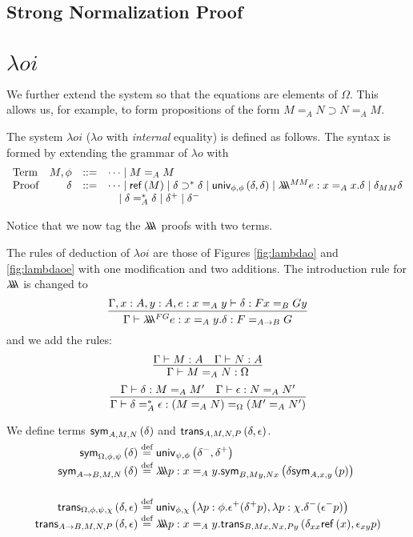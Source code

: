 \subsection{Strong Normalization Proof}







\section{$\lambda o i$}

We further extend the system so that the equations are elements of $\Omega$.  This allows us, for example,
to form propositions of the form $M =_A N \supset N =_A M$.

The system $\lambda o i$ ($\lambda o$ with \emph{internal} equality) is defined as follows.  The
syntax is formed by extending the grammar of $\lambda o$ with
\[
\begin{array}{lrcl}
\text{Term} & M, \phi & ::= & \cdots \mid M =_A M \\
\text{Proof} & \delta & ::= & \cdots \mid \mathsf{ref} \left( {M} \right) \mid \delta \supset^* \delta \mid \mathsf{univ}_{{\phi} , {\phi}} \left( {\delta} , {\delta} \right) \mid \lambda \!\! \lambda \!\! \lambda^{MM} e : x =_A x . \delta \mid \delta_{MM} \delta\\
& & & \quad \mid \delta =^*_A \delta \mid \delta^+ \mid \delta^-
\end{array}
\]

Notice that we now tag the $\lambda \!\! \lambda \!\! \lambda$ proofs with two terms.

The rules of deduction of $\lambda o i$ are those of Figures \ref{fig:lambdao} and \ref{fig:lambdaoe} with one modification and two additions.  The introduction rule for $\lambda \!\! \lambda \!\! \lambda$ is changed to %
\[ \infer{\Gamma \vdash \triplelambda^{FG} e : x =_A y . \delta : F =_{A \rightarrow B} G}
{\Gamma, x : A, y : A, e : x =_A y \vdash \delta : F x =_B G y} \]
and we add the rules:
\[ \infer{\Gamma \vdash M =_A N : \Omega}{\Gamma \vdash M : A \quad \Gamma \vdash N : A} \]
\[ \infer{\Gamma \vdash \delta =^*_A \epsilon : (M =_A N) =_\Omega (M' =_A N')}
{\Gamma \vdash \delta : M =_A M' \quad \Gamma \vdash \epsilon : N =_A N'} \]

We define terms $\mathsf{sym}_{{A},{M},{N}} \left( {\delta} \right)$ and $\mathsf{trans}_{{A},{M},{N},{P}} \left( {\delta} , {\epsilon} \right)$.
\begin{align*}
\sym{\Omega}{\phi}{\psi}{\delta} & \eqdef \univ{\psi}{\phi}{\delta^-}{\delta^+} \\
\sym{A \rightarrow B}{M}{N}{\delta} & \eqdef \triplelambda p:x =_A y. \sym{B}{My}{Nx}{\delta
\sym{A}{x}{y}{p}} \\
& \\
\trans{\Omega}{\phi}{\psi}{\chi}{\delta}{\epsilon} & \eqdef \univ{\phi}{\chi}
{\lambda p:\phi.\epsilon^+(\delta^+ p)}{\lambda p:\chi.\delta^-(\epsilon^- p)} \\
\trans{A \rightarrow B}{M}{N}{P}{\delta}{\epsilon}
& \eqdef \triplelambda p:x =_A y. \trans{B}{Mx}{Nx}{Py}{\delta_{xx} \reff{x}}{\epsilon_{xy} p}
\end{align*}

